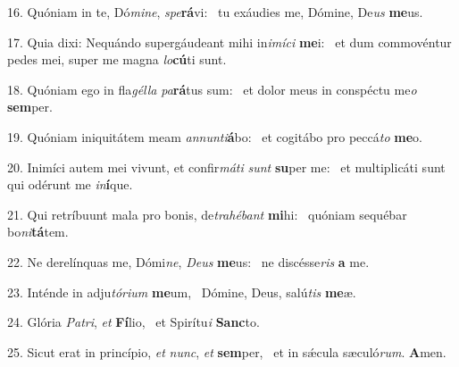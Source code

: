 16. Quóniam in te, Dó\textit{mi}\textit{ne}, \textit{spe}\textbf{rá}vi: \ast\  tu exáudies me, Dómine, De\textit{us} \textbf{me}us.\

17. Quia dixi: Nequándo supergáudeant mihi in\textit{i}\textit{mí}\textit{ci} \textbf{me}i: \ast\  et dum commovéntur pedes mei, super me magna \textit{lo}\textbf{cú}ti sunt.\

18. Quóniam ego in fla\textit{gél}\textit{la} \textit{pa}\textbf{rá}tus sum: \ast\  et dolor meus in conspéctu me\textit{o} \textbf{sem}per.\

19. Quóniam iniquitátem meam \textit{an}\textit{nun}\textit{ti}\textbf{á}bo: \ast\  et cogitábo pro peccá\textit{to} \textbf{me}o.\

20. Inimíci autem mei vivunt, et confir\textit{má}\textit{ti} \textit{sunt} \textbf{su}per me: \ast\  et multiplicáti sunt qui odérunt me \textit{in}\textbf{í}que.\

21. Qui retríbuunt mala pro bonis, de\textit{tra}\textit{hé}\textit{bant} \textbf{mi}hi: \ast\  quóniam sequébar bo\textit{ni}\textbf{tá}tem.\

22. Ne derelínquas me, Dómi\textit{ne}, \textit{De}\textit{us} \textbf{me}us: \ast\  ne discésse\textit{ris} \textbf{a} me.\

23. Inténde in adju\textit{tó}\textit{ri}\textit{um} \textbf{me}um, \ast\  Dómine, Deus, salú\textit{tis} \textbf{me}æ.\

24. Glória \textit{Pa}\textit{tri}, \textit{et} \textbf{Fí}lio, \ast\  et Spirítu\textit{i} \textbf{Sanc}to.\

25. Sicut erat in princípio, \textit{et} \textit{nunc}, \textit{et} \textbf{sem}per, \ast\  et in sǽcula sæculó\textit{rum}. \textbf{A}men.\

